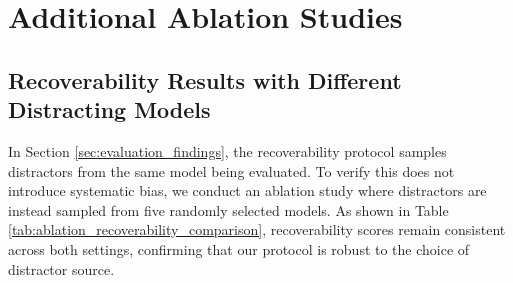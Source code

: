 \documentclass{article} %
\begin{document}
\newpage

\section{Additional Ablation Studies}



\subsection{Recoverability Results with Different Distracting Models}
In Section \ref{sec:evaluation_findings}, the recoverability protocol samples distractors from the same model being evaluated. To verify this does not introduce systematic bias, we conduct an ablation study where distractors are instead sampled from five randomly selected models. As shown in Table \ref{tab:ablation_recoverability_comparison}, recoverability scores remain consistent across both settings, confirming that our protocol is robust to the choice of distractor source.
\end{document}
